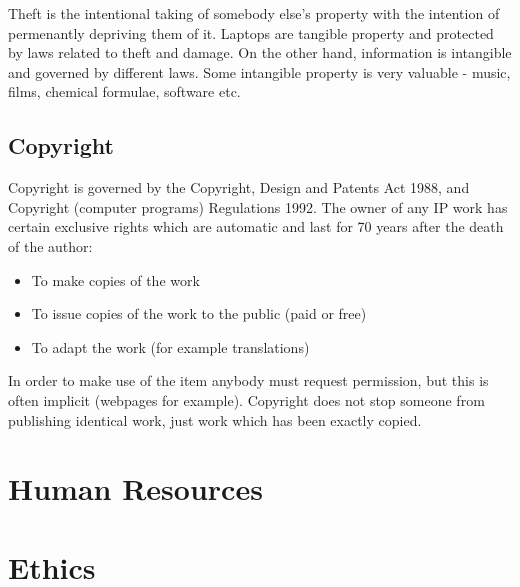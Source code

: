 \documentclass{article}
\begin{document}
	Theft is the intentional taking of somebody else's property with the intention of permenantly depriving them of it. Laptops are tangible property and protected by laws related to theft and damage. On the other hand, information is intangible and governed by different laws. Some intangible property is very valuable - music, films, chemical formulae, software etc.
	
	\subsection{Copyright}
	Copyright is governed by the Copyright, Design and Patents Act 1988, and Copyright (computer programs) Regulations 1992. The owner of any IP work has certain exclusive rights which are automatic and last for 70 years after the death of the author:
	
	\begin{itemize}
	\item To make copies of the work
	\item To issue copies of the work to the public (paid or free)
	\item To adapt the work (for example translations)
	\end{itemize}
	
	In order to make use of the item anybody must request permission, but this is often implicit (webpages for example). Copyright does not stop someone from publishing identical work, just work which has been exactly copied. 
	
	\section{Human Resources}
	
	\section{Ethics}
	
	\newpage
	\printindex	
	
\end{document}
